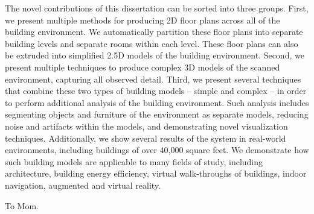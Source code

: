 \documentclass[12pt,onecolumn,oneside]{book}
\begin{document}
The novel contributions of this dissertation can be sorted into three groups.  First, we present multiple methods for producing 2D floor plans across all of the building environment.  We automatically partition these floor plans into separate building levels and separate rooms within each level.  These floor plans can also be extruded into simplified 2.5D models of the building environment.  Second, we present multiple techniques to produce complex 3D models of the scanned environment, capturing all observed detail.  Third, we present several techniques that combine these two types of building models -- simple and complex -- in order to perform additional analysis of the building environment.  Such analysis includes segmenting objects and furniture of the environment as separate models, reducing noise and artifacts within the models, and demonstrating novel visualization techniques.  Additionally, we show several results of the system in real-world environments, including buildings of over 40,000 square feet.  We demonstrate how such building models are applicable to many fields of study, including architecture, building energy efficiency, virtual walk-throughs of buildings, indoor navigation, augmented and virtual reality.


\newpage
{}
\setcounter{page}{1}

\clearpage
\vspace*{\fill}
\begin{center}
To Mom.
\end{center}
\vfill %
\clearpage

\tableofcontents{}

\cleardoublepage
{}
{}
\listoffigures{}

\end{document}

